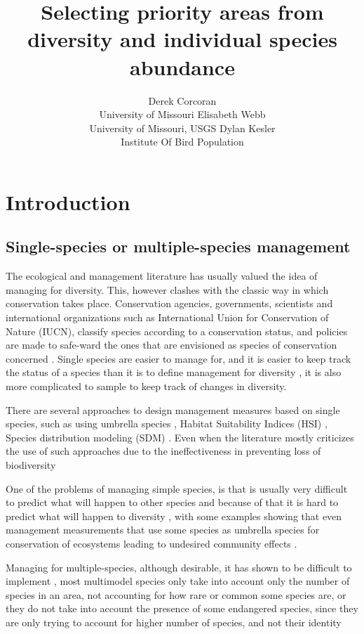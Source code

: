 \documentclass[article]{jss}
\author{
Derek Corcoran\\University of Missouri \And Elisabeth Webb\\University of Missouri, USGS \And Dylan Kesler\\Institute Of Bird Population
}
\title{Selecting priority areas from diversity and individual species abundance
\pkg{DiversityOccupancy}}
\begin{document}
\section{Introduction}\label{introduction}

\subsection{Single-species or multiple-species
management}\label{single-species-or-multiple-species-management}

The ecological and management literature has usually valued the idea of
managing for diversity. This, however clashes with the classic way in
which conservation takes place. Conservation agencies, governments,
scientists and international organizations such as International Union
for Conservation of Nature (IUCN), classify species according to a
conservation status, and policies are made to safe-ward the ones that
are envisioned as species of conservation concerned
\citep{keller2004red, rodrigues2006value}. Single species are easier to
manage for, and it is easier to keep track the status of a species than
it is to define management for diversity
\citep{simberloff1998flagships}, it is also more complicated to sample
to keep track of changes in diversity.

There are several approaches to design management measures based on
single species, such as using umbrella species
\citep{crosby2015looking, bichet2016maintaining}, Habitat Suitability
Indices (HSI)
\citep{reza2013integrating, soniat2013predicting, zohmann2013modelling},
Species distribution modeling (SDM)
\citep{peterson2011ecological, guisan2013predicting}. Even when the
literature mostly criticizes the use of such approaches due to the
ineffectiveness in preventing loss of biodiversity
\citep{roberge2004usefulness, branton2011assessing}

One of the problems of managing simple species, is that is usually very
difficult to predict what will happen to other species and because of
that it is hard to predict what will happen to diversity
\citep{pulliam2000relationship}, with some examples showing that even
management measurements that use some species as umbrella species for
conservation of ecosystems leading to undesired community effects
\citep{white2013conservation}.

Managing for multiple-species, although desirable, it has shown to be
difficult to implement
\citep{mollmann2014implementing, lmgren2015baltic}, most multimodel
species only take into account only the number of species in an area,
not accounting for how rare or common some species are, or they do not
take into account the presence of some endangered species, since they
are only trying to account for higher number of species, and not their
identity
\citep{taft2002waterbird, tori2002wetland, plaganyi2014multispecies}
\end{document}
